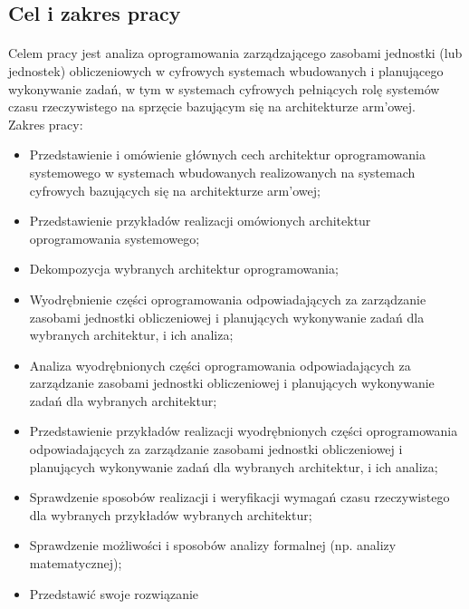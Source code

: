 \documentclass[../main]{subfiles}
\begin{document}
\subsection{Cel i zakres pracy}

\paragraph{}
Celem pracy jest analiza oprogramowania zarządzającego zasobami jednostki (lub jednostek)
obliczeniowych w cyfrowych systemach wbudowanych i planującego wykonywanie zadań, w tym w systemach
cyfrowych pełniących rolę systemów czasu rzeczywistego na sprzęcie bazującym się na architekturze
\acrshort{arm}'owej.\\

Zakres pracy:
\begin{itemize}
    \item Przedstawienie i omówienie głównych cech architektur oprogramowania systemowego w systemach wbudowanych realizowanych na systemach cyfrowych bazujących się na architekturze \acrshort{arm}'owej;
    \item Przedstawienie przykładów realizacji omówionych architektur oprogramowania systemowego;
    \item Dekompozycja wybranych architektur oprogramowania;
    \item Wyodrębnienie części oprogramowania odpowiadających za zarządzanie zasobami jednostki obliczeniowej i planujących wykonywanie zadań dla wybranych architektur, i ich analiza;
    \item Analiza wyodrębnionych części oprogramowania odpowiadających za zarządzanie zasobami jednostki obliczeniowej i planujących wykonywanie zadań dla wybranych architektur;
    \item Przedstawienie przykładów realizacji wyodrębnionych części oprogramowania odpowiadających za zarządzanie zasobami jednostki obliczeniowej i planujących wykonywanie zadań dla wybranych architektur, i ich analiza;
    \item Sprawdzenie sposobów realizacji i weryfikacji wymagań czasu rzeczywistego dla wybranych przykładów wybranych architektur;
    \item Sprawdzenie możliwości i sposobów analizy formalnej (np. analizy matematycznej);
    \item Przedstawić swoje rozwiązanie
\end{itemize}
\end{document}
